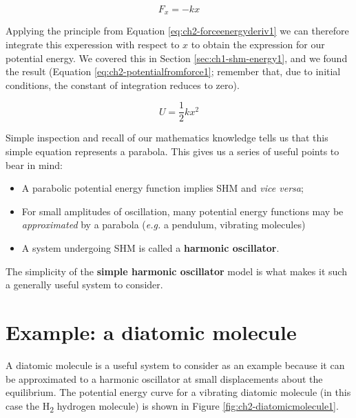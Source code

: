 \documentclass[
]{book}
\providecommand{\tightlist}{%
  \setlength{\itemsep}{0pt}\setlength{\parskip}{0pt}}
\begin{document}
\begin{equation}
F_x = -kx
\label{eq:ch2-hookeslaw1}
\end{equation}

Applying the principle from Equation \eqref{eq:ch2-forceenergyderiv1} we can therefore integrate this experession with respect to \(x\) to obtain the expression for our potential energy. We covered this in Section \ref{sec:ch1-shm-energy1}, and we found the result (Equation \eqref{eq:ch2-potentialfromforce1}; remember that, due to initial conditions, the constant of integration reduces to zero).

\begin{equation}
U  = \frac{1}{2}kx^2 
\label{eq:ch2-potentialfromforce1}
\end{equation}

Simple inspection and recall of our mathematics knowledge tells us that this simple equation represents a parabola. This gives us a series of useful points to bear in mind:

\begin{itemize}
\tightlist
\item
  A parabolic potential energy function implies SHM and \emph{vice versa};
\item
  For small amplitudes of oscillation, many potential energy functions may be \emph{approximated} by a parabola (\emph{e.g.} a pendulum, vibrating molecules)
\item
  A system undergoing SHM is called a \textbf{harmonic oscillator}.
\end{itemize}

The simplicity of the \textbf{simple harmonic oscillator} model is what makes it such a generally useful system to consider.

\hypertarget{sec:ch2-diatomicmolecule}{%
\section{Example: a diatomic molecule}\label{sec:ch2-diatomicmolecule}}

A diatomic molecule is a useful system to consider as an example because it can be approximated to a harmonic oscillator at small displacements about the equilibrium. The potential energy curve for a vibrating diatomic molecule (in this case the H\textsubscript{2} hydrogen molecule) is shown in Figure \ref{fig:ch2-diatomicmolecule1}.
\end{document}
